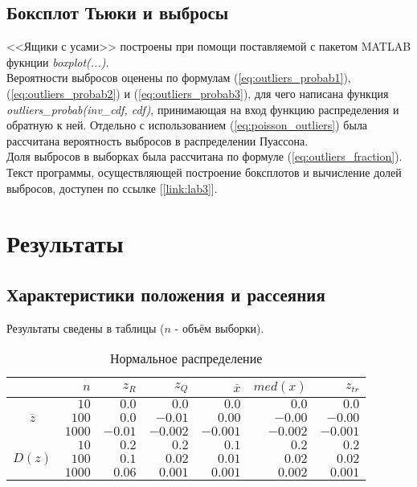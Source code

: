 \documentclass[zuev_report2.tex]{subfiles}
\begin{document}
\subsection{Боксплот Тьюки и выбросы}
<<Ящики с усами>> построены при помощи поставляемой с пакетом MATLAB фукнции \textit{boxplot(...)}.\\
Вероятности выбросов оценены по формулам (\ref{eq:outliers_probab1}), (\ref{eq:outliers_probab2}) и (\ref{eq:outliers_probab3}), для чего написана функция \textit{outliers\_probab(inv\_cdf, cdf)}, принимающая на вход функцию распределения и обратную к ней. Отдельно с использованием (\ref{eq:poisson_outliers}) была рассчитана вероятность выбросов в распределении Пуассона.\\
Доля выбросов в выборках была рассчитана по формуле (\ref{eq:outliers_fraction}).\\
Текст программы, осуществляющей построение боксплотов и вычисление долей выбросов, доступен по ссылке [\ref{link:lab3}].


\newpage
\section{Результаты}
\subsection{Характеристики положения и рассеяния}
Результаты сведены в таблицы ($n$ - объём выборки).
\begin{table}[H]
\centering
\caption{Нормальное распределение}
\begin{tabular}{c*6r}
\toprule
{} &         
$n$  & 
\centering $z_R$ & 
\centering $z_Q$ &
\centering $\overline{x}$& 
\centering $med(x)$ &
\centering $z_{tr}$ \tabularnewline
\midrule
\multirow{3}{*}{$\overline{z}$}
& $10$    & $ 0.0$  & $ 0.0$  & $ 0.0$  & $ 0.0$  & $ 0.0$ \\
& $100$   & $ 0.0$  & $-0.01$  & $ 0.00$  & $-0.00$  & $-0.00$ \\
& $1000$  & $-0.01$  & $-0.002$  & $-0.001$  & $-0.002$  & $-0.001$ \\
\midrule
\multirow{3}{*}{$D(z)$}
& $10$    & $0.2$  & $0.2$  & $0.1$  & $0.2$  & $0.2$ \\
& $100$   & $0.1$  & $0.02$  & $0.01$  & $0.02$  & $0.02$ \\
& $1000$  & $0.06$  & $0.001$  & $0.001$  & $0.002$  & $0.001$ \\              
\bottomrule
\end{tabular}
\label{table:norm}
\end{table}
\end{document}

